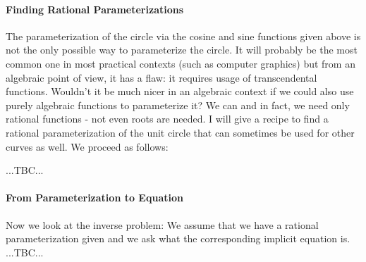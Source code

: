 \paragraph{Finding Rational Parameterizations}
The parameterization of the circle via the cosine and sine functions given above is not the only possible way to parameterize the circle. It will probably be the most common one in most practical contexts (such as computer graphics) but from an algebraic point of view, it has a flaw: it requires usage of transcendental functions. Wouldn't it be much nicer in an algebraic context if we could also use purely algebraic functions to parameterize it? We can and in fact, we need only rational functions - not even roots are needed. I will give a recipe to find a rational parameterization of the unit circle that can sometimes be used for other curves as well. We proceed as follows:


...TBC...





\paragraph{From Parameterization to Equation}
Now we look at the inverse problem: We assume that we have a rational parameterization given and we ask what the corresponding implicit equation is. ...TBC...








